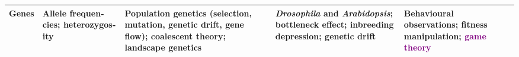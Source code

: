 \documentclass[english,11pt,a4paper, landscape]{article}
\begin{document}
\begin{tabularx}{\textwidth}{p{2cm}>{\raggedright\arraybackslash}X>{\raggedright\arraybackslash}X>{\raggedright\arraybackslash}X|>{\raggedright\arraybackslash}X}
\rowcolor{lightgray}
\textbf{Genes} & Allele frequen­cies; heterozygos­ity & Population genetics (selection, mutation, genetic drift, gene flow); coalescent the­ory; landscape genetics & \emph{Drosophila} and \emph{Ara­bidopsis}; bottleneck effect; in­breeding depression; genetic drift & Behavioural observations; fitness manipulation; \textcolor{purple}{game theory} \\ \hline
\end{tabularx}


 

\end{document}
